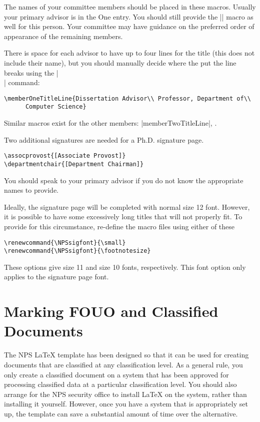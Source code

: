 The names of your committee members should be placed in these macros.  Usually your primary advisor is in the One entry. You should still provide the |\thesisadvisor{[ADVISOR]}| macro as well for this person.  Your committee may have guidance on the preferred order of appearance of the remaining members.

There is space for each advisor to have up to four lines for the title (this does not include their name), but you should manually decide where the put the line breaks using the |\\| command:

\begin{Verbatim}
\memberOneTitleLine{Dissertation Advisor\\ Professor, Department of\\ 
      Computer Science}
\end{Verbatim}

Similar macros exist for the other members: |memberTwoTitleLine|, \etc.

Two additional signatures are needed for a Ph.D. signature page.  

\begin{Verbatim}
\assocprovost{[Associate Provost]}
\departmentchair{[Department Chairman]}
\end{Verbatim}

You should speak to your primary advisor if you do not know the appropriate names to provide.

Ideally, the signature page will be completed with normal size 12 font.  However, it is possible to have some excessively long titles that will not properly fit.  To provide for this circumstance, re-define the macro files using either of these

\begin{Verbatim}
\renewcommand{\NPSsigfont}{\small}
\renewcommand{\NPSsigfont}{\footnotesize}
\end{Verbatim}

These options give size 11 and size 10 fonts, respectively.  This font option only applies to the signature page font.



\section{Marking FOUO and Classified Documents}\label{sec:classified}
The NPS \LaTeX{} template has been designed so that it can be used
for creating documents that are 
classified at any classification level. As a general rule, you only
create a classified document on a system that has been approved for
processing classified data at a particular classification level. You
should also arrange for the NPS security office to install \LaTeX{} on
the system, rather than installing it yourself. However, once you have
a system that is appropriately set up, the template can save a
substantial amount of time over the alternative.

